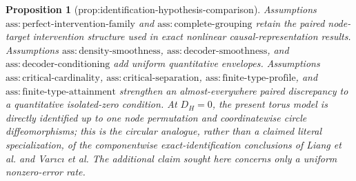 \documentclass{article}
\newtheorem{proposition}{Proposition}
\begin{document}
\begin{proposition}[prop:identification-hypothesis-comparison]\label{prop:identification-hypothesis-comparison}
Assumptions \(\mathrm{ass:perfect\text{-}intervention\text{-}family}\) and \(\mathrm{ass:complete\text{-}grouping}\) retain the paired node-target intervention structure used in exact nonlinear causal-representation results. Assumptions \(\mathrm{ass:density\text{-}smoothness}\), \(\mathrm{ass:decoder\text{-}smoothness}\), and \(\mathrm{ass:decoder\text{-}conditioning}\) add uniform quantitative envelopes. Assumptions \(\mathrm{ass:critical\text{-}cardinality}\), \(\mathrm{ass:critical\text{-}separation}\), \(\mathrm{ass:finite\text{-}type\text{-}profile}\), and \(\mathrm{ass:finite\text{-}type\text{-}attainment}\) strengthen an almost-everywhere paired discrepancy to a quantitative isolated-zero condition. At \(D_H=0\), the present torus model is directly identified up to one node permutation and coordinatewise circle diffeomorphisms; this is the circular analogue, rather than a claimed literal specialization, of the componentwise exact-identification conclusions of Liang et al. and Varıcı et al. The additional claim sought here concerns only a uniform nonzero-error rate.
\end{proposition}
\end{document}
